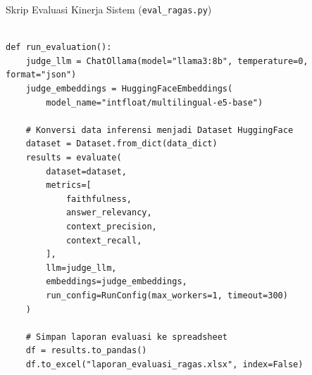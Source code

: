\begin{myblock}{Skrip Evaluasi Kinerja Sistem (\texttt{eval\_ragas.py})}\label{kode:eval}
\begin{verbatim}

def run_evaluation():
    judge_llm = ChatOllama(model="llama3:8b", temperature=0, format="json")
    judge_embeddings = HuggingFaceEmbeddings(
        model_name="intfloat/multilingual-e5-base") 
    
    # Konversi data inferensi menjadi Dataset HuggingFace
    dataset = Dataset.from_dict(data_dict)
    results = evaluate(
        dataset=dataset,
        metrics=[
            faithfulness,
            answer_relevancy,
            context_precision,
            context_recall,
        ],
        llm=judge_llm,
        embeddings=judge_embeddings,
        run_config=RunConfig(max_workers=1, timeout=300)
    )

    # Simpan laporan evaluasi ke spreadsheet
    df = results.to_pandas()
    df.to_excel("laporan_evaluasi_ragas.xlsx", index=False)
\end{verbatim}
\end{myblock}